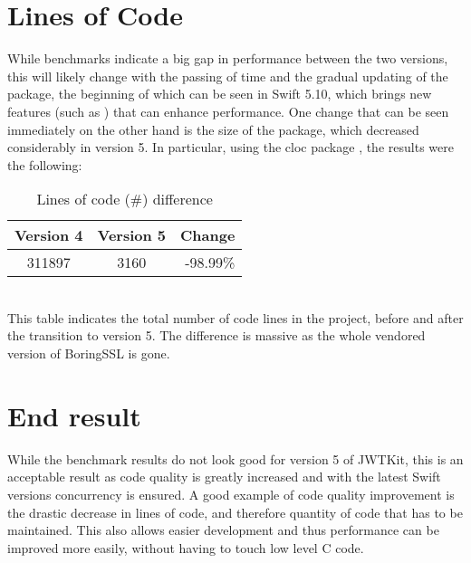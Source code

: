 \section{Lines of Code}
While benchmarks indicate a big gap in performance between the two versions, this will likely change with the passing of time and the gradual updating of the package, the beginning of which can be seen in Swift 5.10, which brings new features (such as ) that can enhance performance. One  change that can be seen immediately on the other hand is the size of the package, which decreased considerably in version 5. In particular, using the cloc package \cite{cloc}, the results were the following:
\begin{table}[ht]
    \centering
    \begin{tabular}{ccr}
        \toprule
        Version 4 & Version 5 & Change \\
        \midrule
        311897 & 3160 & \textcolor{darkergreen}{-98.99\%} \\
        \bottomrule
    \end{tabular}
    \caption{Lines of code (\#) difference }
\end{table} \\
This table indicates the total number of code lines in the project, before and after the transition to version 5. The difference is massive as the whole vendored version of BoringSSL is gone. 

\section{End result}
While the benchmark results do not look good for version 5 of JWTKit, this is an acceptable result as code quality is greatly increased and with the latest Swift versions concurrency is ensured. A good example of code quality improvement is the drastic decrease in lines of code, and therefore quantity of code that has to be maintained. This also allows easier development and thus performance can be improved more easily, without having to touch low level C code. 
